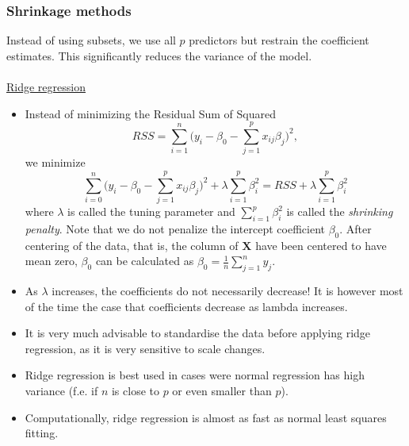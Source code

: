 \subsubsection*{Shrinkage methods}
Instead of using subsets, we use all $p$ predictors but restrain the coefficient estimates. This significantly reduces the variance of the model.\\
\\
\underline{Ridge regression}
\begin{itemize}
    \item Instead of minimizing the Residual Sum of Squared \begin{equation*}
        RSS = \sum_{i=1}^n \bigg( y_i - \beta_0 - \sum_{j=1}^p x_{ij}\beta_j\bigg)^2,
    \end{equation*} we minimize
    \begin{equation*}
        \sum_{i=0}^n \bigg( y_i - \beta_0 - \sum_{j=1}^p x_{ij}\beta_j\bigg)^2 + \lambda \sum_{i=1}^p \beta_i^2 = RSS + \lambda \sum_{i=1}^p \beta_i^2
    \end{equation*}
    where $\lambda$ is called the tuning parameter and $\sum_{i=1}^p \beta_i^2$ is called the \textit{shrinking penalty}. Note that we do not penalize the intercept coefficient $\beta_0$. After centering of the data, that is, the column of $\textbf{X}$ have been centered to have mean zero, $\beta_0$ can be calculated as $\beta_0 = \frac{1}{n}\sum_{j=1}^n y_j$.
    \item As $\lambda$ increases, the coefficients do not necessarily decrease! It is however most of the time the case that coefficients decrease as lambda increases.
    \item It is very much advisable to standardise the data before applying ridge regression, as it is very sensitive to scale changes.
    \item Ridge regression is best used in cases were normal regression has high variance (f.e. if $n$ is close to $p$ or even smaller than $p$).
    \item Computationally, ridge regression is almost as fast as normal least squares fitting.
\end{itemize}

